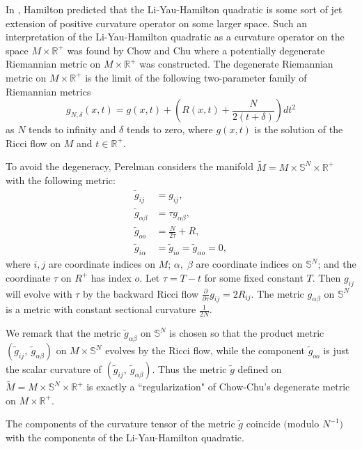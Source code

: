 In \cite{Ha95F}, Hamilton predicted that the Li-Yau-Hamilton
quadratic is some sort of jet extension of positive curvature
operator on some larger space. Such an interpretation of the
Li-Yau-Hamilton quadratic as a curvature operator on the space
$M\times \mathbb{R}^{+}$ was found by Chow and Chu \cite{ChCh95}
where a potentially degenerate Riemannian metric on $M\times
\mathbb{R}^+$ was constructed. The degenerate Riemannian metric on
$M\times \mathbb{R}^+$ is the limit of the following two-parameter
family of Riemannian metrics
$$
g_{N,\delta}(x,t)=g(x,t)+(R(x,t)+\frac{N}{2(t+\delta)})dt^{2}
$$
as $N$ tends to infinity and $\delta$ tends to zero, where
$g(x,t)$ is the solution of the Ricci flow on $M$ and $t\in
\mathbb{R}^{+}$.

To avoid the degeneracy, Perelman \cite{P1} considers the manifold
$\tilde{M}=M\times \mathbb{S}^N\times \mathbb{R}^+$ with the
following metric:
\begin{align*}
\tilde{g}_{ij}&  = g_{ij},\\
\tilde{g}_{\alpha\beta}&  = \tau g_{\alpha\beta},\\
\tilde{g}_{oo}&  = \frac{N}{2\tau}+R,\\
\tilde{g}_{i\alpha} &  = \tilde{g}_{io} =\tilde{g}_{\alpha o}=0,
\end{align*}
where $i,j$ are coordinate indices on $M$; $\alpha,\;\beta$ are
coordinate indices on $\mathbb{S}^N$; and the coordinate $\tau$ on
$R^+$ has index $o$. Let $\tau = T-t$ for some fixed constant $T$.
Then $g_{ij}$ will evolve with $\tau$ by the backward Ricci flow
$\frac{\partial}{\partial \tau}g_{ij}=2R_{ij}$. The metric
$g_{\alpha\beta}$ on $\mathbb{S}^N$ is a metric with constant
sectional curvature $\frac{1}{2N}$.

We remark that the metric $\tilde{g}_{\alpha\beta}$ on
$\mathbb{S}^N$ is chosen so that the product metric
$(\tilde{g}_{ij},\ \tilde{g}_{\alpha\beta})$ on $M\times
\mathbb{S}^N$ evolves by the Ricci flow, while the component
$\tilde{g}_{oo}$ is just the scalar curvature of
$(\tilde{g}_{ij},\ \tilde{g}_{\alpha\beta})$. Thus the metric
$\tilde{g}$ defined on $\tilde{M}=M\times \mathbb{S}^N \times
\mathbb{R}^+$ is exactly a ``regularization" of Chow-Chu's
degenerate metric on $M\times\mathbb{R}^+$.  \vskip 0.2cm

\begin{proposition}
  \label{prop:cz-space-time-curvature-and-the-liyauhamilton-quadratic}
The components of the curvature tensor of the metric $\tilde{g}$
coincide $($modulo $N^{-1})$ with the components of the
Li-Yau-Hamilton quadratic.
\end{proposition}

